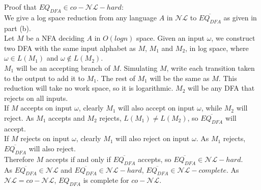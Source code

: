 \documentclass{assignment}
\begin{document}
\begin{problemlist}
\begin{answer}
\begin{enumerate}
  Proof that $EQ_{DFA} \in co-\mathcal{NL}-hard$:\\
  We give a log space reduction from any language $A$ in $\mathcal{NL}$ to $\overline{EQ_{DFA}}$ as given in part (b).\\
  Let $M$ be a NFA deciding $A$ in $O(log n)$ space. Given an input $\omega$, we construct two DFA with the same input alphabet as $M$, $M_1$ and $M_2$, in log space, where $\omega \in L(M_1)$ and $\omega \notin L(M_2)$.\\
  $M_1$ will be an accepting branch of $M$. Simulating $M$, write each transition taken to the output to add it to $M_1$. The rest of $M_1$ will be the same as $M$. This reduction will take no work space, so it is logarithmic. $M_2$ will be any DFA that rejects on all inputs.\\
  If $M$ accepts on input $\omega$, clearly $M_1$ will also accept on input $\omega$, while $M_2$ will reject. As $M_1$ accepts and $M_2$ rejects, $L(M_1) \neq L(M_2)$, so $\overline{EQ_{DFA}}$ will accept.\\
  If $M$ rejects on input $\omega$, clearly $M_1$ will also reject on input $\omega$. As $M_1$ rejects, $\overline{EQ_{DFA}}$ will also reject.\\
  Therefore $M$ accepts if and only if $\overline{EQ_{DFA}}$ accepts, so $\overline{EQ_{DFA}} \in \mathcal{NL}-hard$.\\
  As $\overline{EQ_{DFA}} \in \mathcal{NL}$ and $\overline{EQ_{DFA}} \in \mathcal{NL}-hard$, $\overline{EQ_{DFA}} \in \mathcal{NL}-complete$. As $\mathcal{NL}=co-\mathcal{NL}$, $EQ_{DFA}$ is complete for $co-\mathcal{NL}$.
\end{enumerate}
\end{answer}
\end{problemlist}
\end{document}

